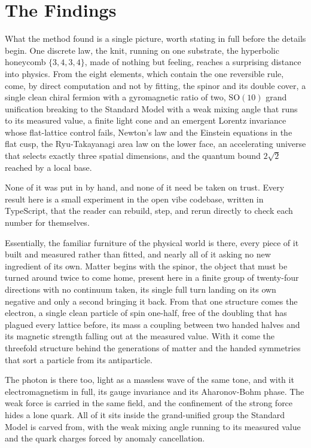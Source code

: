 \section{The Findings}

What the method found is a single picture, worth stating in full before the details begin. One discrete law, the knit, running on one substrate, the hyperbolic honeycomb $\{3,4,3,4\}$, made of nothing but feeling, reaches a surprising distance into physics. From the eight elements, which contain the one reversible rule, come, by direct computation and not by fitting, the spinor and its double cover, a single clean chiral fermion with a gyromagnetic ratio of two, $\mathrm{SO}(10)$ grand unification breaking to the Standard Model with a weak mixing angle that runs to its measured value, a finite light cone and an emergent Lorentz invariance whose flat-lattice control fails, Newton's law and the Einstein equations in the flat cusp, the Ryu-Takayanagi area law on the lower face, an accelerating universe that selects exactly three spatial dimensions, and the quantum bound $2\sqrt 2$ reached by a local base.

None of it was put in by hand, and none of it need be taken on trust. Every result here is a small experiment in the open vibe codebase, written in TypeScript, that the reader can rebuild, step, and rerun directly to check each number for themselves. \cite{pollard2026vibetest}

Essentially, the familiar furniture of the physical world is there, every piece of it built and measured rather than fitted, and nearly all of it asking no new ingredient of its own. Matter begins with the spinor, the object that must be turned around twice to come home, present here in a finite group of twenty-four directions with no continuum taken, its single full turn landing on its own negative and only a second bringing it back. From that one structure comes the electron, a single clean particle of spin one-half, free of the doubling that has plagued every lattice before, its mass a coupling between two handed halves and its magnetic strength falling out at the measured value. With it come the threefold structure behind the generations of matter and the handed symmetries that sort a particle from its antiparticle.

The photon is there too, light as a massless wave of the same tone, and with it electromagnetism in full, its gauge invariance and its Aharonov-Bohm phase. The weak force is carried in the same field, and the confinement of the strong force hides a lone quark. All of it sits inside the grand-unified group the Standard Model is carved from, with the weak mixing angle running to its measured value and the quark charges forced by anomaly cancellation.

